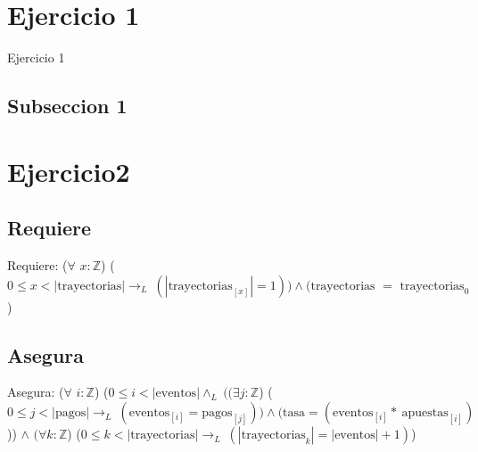 \documentclass{article} %
\begin{document}
\section{Ejercicio 1}

Ejercicio 1

\subsection{Subseccion 1}

\section{Ejercicio2}
\subsection{Requiere}
Requiere: ($\forall$ \( x :  \mathbb{Z} \)) (\(0 \leq x < |\text{trayectorias}| \rightarrow _{L}\  (|\text{trayectorias}_{[x]}| = 1))  \land ( \text{trayectorias } = \text{ trayectorias}_{0}\))
\subsection{Asegura}
Asegura: ($\forall$ \( i :  \mathbb{Z} \)) (\(0 \leq i < |\text{eventos}| \land _{L}\ ((\exists  j :  \mathbb{Z} \)) (\(0 \leq j < |\text{pagos}| \rightarrow _{L}\ (\text{eventos}_{[i]} = \text{pagos}_{[j]})) \land ( \text{tasa} = (\text{eventos}_{[i]} \ast\ \text{apuestas}_{[i]})\))) \(\land\) \((\forall k : \mathbb{Z} \)) (\(0 \leq k < |\text{trayectorias}| \rightarrow _{L}\ (|\text{trayectorias}_{k}| = |\text{eventos}| + 1)\))
\end{document}
